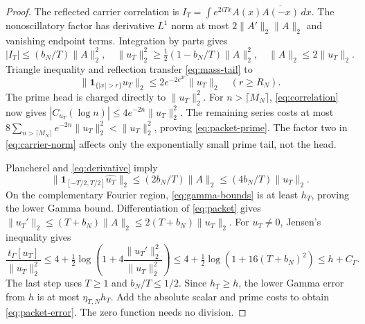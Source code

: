 \documentclass[11pt]{article}
\theoremstyle{remark}
\newcommand{\norm}[1]{\lVert #1\rVert}
\newcommand{\one}{\mathbf 1}
\newcommand{\tg}{t_\Gamma}
\begin{document}
\begin{proof}
The reflected carrier correlation is
$I_T=\int e^{2iTx}A(x)\overline{A(-x)}\,dx$.
The nonoscillatory factor has derivative $L^1$ norm at most
$2\norm{A'}_2\norm A_2$ and vanishing endpoint terms.
Integration by parts gives
\begin{equation}\label{eq:carrier-norm}
 |I_T|\le(b_N/T)\norm A_2^2,\quad
 \norm{u_T}_2^2\ge\tfrac12(1-b_N/T)\norm A_2^2,\quad
 \norm A_2\le2\norm{u_T}_2.
\end{equation}
Triangle inequality and reflection transfer \eqref{eq:mass-tail} to
\[
 \norm{\one_{\{|x|>r\}}u_T}_2
       \le2e^{-2e^{2r}}\norm{u_T}_2\quad(r\ge R_N).
\]
The prime head is charged directly to $\norm{u_T}_2^2$.
For $n>\lceil M_N\rceil$, \eqref{eq:correlation} now gives
$|C_{u_T}(\log n)|\le4e^{-2n}\norm{u_T}_2^2$.
The remaining series costs at most
$8\sum_{n>\lceil M_N\rceil}e^{-2n}\norm{u_T}_2^2
 <\norm{u_T}_2^2$, proving \eqref{eq:packet-prime}.
The factor two in \eqref{eq:carrier-norm} affects only the
exponentially small prime tail, not the head.

Plancherel and \eqref{eq:derivative} imply
\[
 \norm{\one_{[-T/2,T/2]}\widehat{u_T}}_2
      \le(2b_N/T)\norm A_2\le(4b_N/T)\norm{u_T}_2.
\]
On the complementary Fourier region, \eqref{eq:gamma-bounds} is at least
$h_T$, proving the lower Gamma bound.
Differentiation of \eqref{eq:packet} gives
$\norm{u_T'}_2\le(T+b_N)\norm A_2
                  \le2(T+b_N)\norm{u_T}_2$.
For $u_T\ne0$, Jensen's inequality gives
\[
 \frac{\tg[u_T]}{\norm{u_T}_2^2}
 \le4+\tfrac12\log\left(1+4\frac{\norm{u_T'}_2^2}{\norm{u_T}_2^2}\right)
 \le4+\tfrac12\log(1+16(T+b_N)^2)\le h+C_\Gamma.
\]
The last step uses $T\ge1$ and $b_N/T\le1/2$.
Since $h_T\ge h$, the lower Gamma error from $h$ is at most
$\eta_{T,N}h_T$. Add the absolute scalar and prime costs to obtain
\eqref{eq:packet-error}. The zero function needs no division.
\end{proof}
\end{document}
